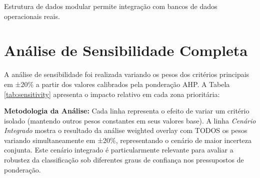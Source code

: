 \documentclass[12pt, a4paper]{article}
\begin{document}
\begin{itemize}
Estrutura de dados modular permite integração com bancos de dados operacionais reais.

\section{Análise de Sensibilidade Completa}

A análise de sensibilidade foi realizada variando os pesos dos critérios principais em ±20\% a partir dos valores calibrados pela ponderação AHP. A Tabela \ref{tab:sensitivity} apresenta o impacto relativo em cada zona prioritária:

\textbf{Metodologia da Análise:} Cada linha representa o efeito de variar um critério isolado (mantendo outros pesos constantes em seus valores base). A linha \textit{Cenário Integrado} mostra o resultado da análise weighted overlay com TODOS os pesos variando simultaneamente em ±20\%, representando o cenário de maior incerteza conjunta. Este cenário integrado é particularmente relevante para avaliar a robustez da classificação sob diferentes graus de confiança nos pressupostos de ponderação.


\end{itemize}
\end{document}
